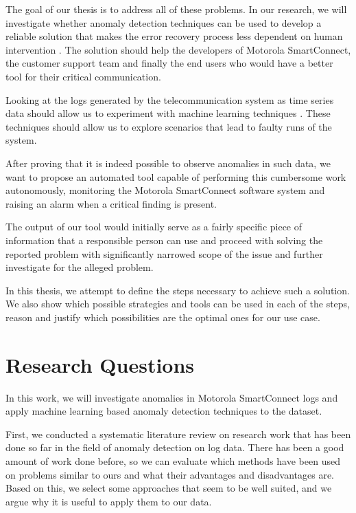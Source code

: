 The goal of our thesis is to address all of these problems. 
In our research, we will investigate whether anomaly detection techniques can be used to develop a reliable solution that makes the error recovery process less dependent on human intervention \cite{logCluster2016} \cite{pca1997} \cite{lou2010} \cite{liu2012isolation}.
The solution should help the developers of Motorola SmartConnect, the customer support team and finally the end users who would have a better tool for their critical communication.

Looking at the logs generated by the telecommunication system as time series data should allow us to experiment with machine learning techniques \cite{wang2017timeseriesanomaly}. These techniques should allow us to explore scenarios that lead to faulty runs of the system.

After proving that it is indeed possible to observe anomalies in such data, we want to propose an automated tool capable of performing this cumbersome work autonomously, monitoring the Motorola SmartConnect software system and raising an alarm when a critical finding is present.

The output of our tool would initially serve as a fairly specific piece of information that a responsible person can use and proceed with solving the reported problem with significantly narrowed scope of the issue and further investigate for the alleged problem.

In this thesis, we attempt to define the steps necessary to achieve such a solution. We also show which possible strategies and tools can be used in each of the steps, reason and justify which possibilities are the optimal ones for our use case.


\section {Research Questions}

In this work, we will investigate anomalies in Motorola SmartConnect logs and apply machine learning based anomaly detection techniques to the dataset.

First, we conducted a systematic literature review on research work that has been done so far in the field of anomaly detection on log data. There has been a good amount of work done before, so we can evaluate which methods have been used on problems similar to ours and what their advantages and disadvantages are. Based on this, we select some approaches that seem to be well suited, and we argue why it is useful to apply them to our data.

